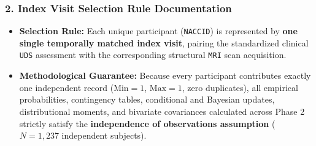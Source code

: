 \documentclass[11pt, a4paper]{article}
\begin{document}
\subsubsection*{2. Index Visit Selection Rule Documentation}
\begin{itemize}
    \item \textbf{Selection Rule:} Each unique participant (\texttt{NACCID}) is represented by \textbf{one single temporally matched index visit}, pairing the standardized clinical \texttt{UDS} assessment with the corresponding structural \texttt{MRI} scan acquisition.
    \item \textbf{Methodological Guarantee:} Because every participant contributes exactly one independent record ($\text{Min} = 1$, $\text{Max} = 1$, zero duplicates), all empirical probabilities, contingency tables, conditional and Bayesian updates, distributional moments, and bivariate covariances calculated across Phase 2 strictly satisfy the \textbf{independence of observations assumption} ($N = 1,237$ independent subjects).
\end{itemize}
\end{document}
